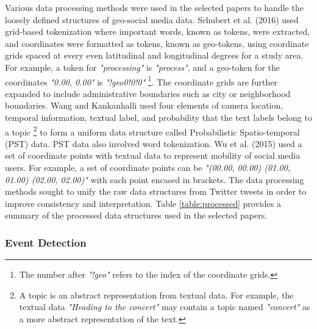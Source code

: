 Various data processing methods were used in the selected papers to handle the loosely defined structures of geo-social media data. Schubert et al. (2016) \cite{Schubert:2016} used grid-based tokenization where important words, known as tokens, were extracted, and coordinates were formatted as tokens, known as geo-tokens, using coordinate grids spaced at every even latitudinal and longitudinal degrees for a study area. For example, a token for \textit{"processing"} is \textit{"process"}, and a geo-token for the coordinates \textit{"0.00, 0.00"} is \textit{"!geo0!0!0"} \footnote{The number after \textit{"!geo"} refers to the index of the coordinate grids.}. The coordinate grids are further expanded to include administrative boundaries such as city or neighborhood boundaries. Wang and Kankanhalli \cite{Wang:2015} used four elements of camera location, temporal information, textual label, and probability that the text labels belong to a topic \footnote{A topic is an abstract representation from textual data. For example, the textual data \textit{"Heading to the concert"} may contain a topic named \textit{"concert"} as a more abstract representation of the text.} to form a uniform data structure called Probabilistic Spatio-temporal (PST) data. PST data also involved word tokenization. Wu et al. (2015) \cite{Wu:2015} used a set of coordinate points with textual data to represent mobility of social media users. For example, a set of coordinate points can be \textit{"(00.00, 00.00) (01.00, 01.00) (02.00, 02.00)"} with each point encased in brackets. The data processing methods sought to unify the raw data structures from Twitter tweets in order to improve consistency and interpretation.  Table \ref{table:processed} provides a summary of the processed data structures used in the selected papers.

\subsubsection{Event Detection} \label{event-detection}

